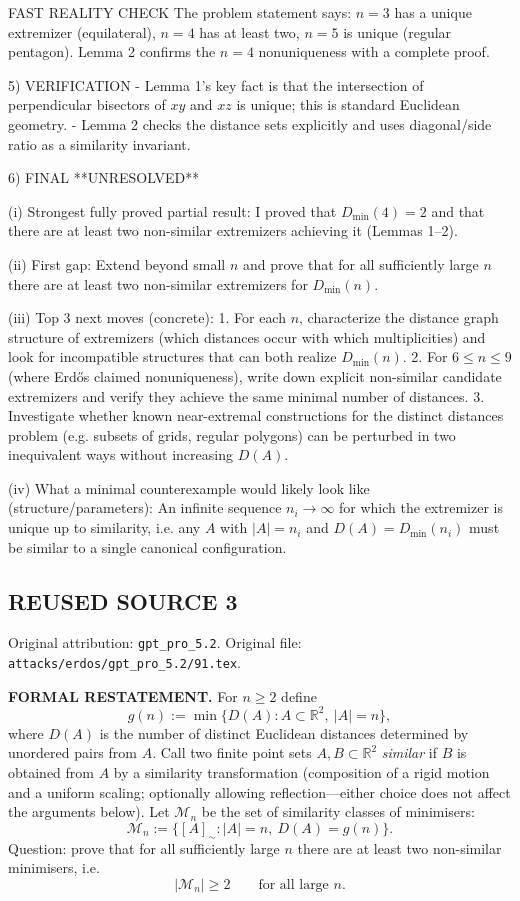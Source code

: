 FAST REALITY CHECK
The problem statement says: $n=3$ has a unique extremizer (equilateral), $n=4$ has at least two, $n=5$ is unique (regular pentagon).
Lemma 2 confirms the $n=4$ nonuniqueness with a complete proof.

5) VERIFICATION
- Lemma 1's key fact is that the intersection of perpendicular bisectors of $xy$ and $xz$ is unique; this is standard Euclidean geometry.
- Lemma 2 checks the distance sets explicitly and uses diagonal/side ratio as a similarity invariant.

6) FINAL
**UNRESOLVED**

(i) Strongest fully proved partial result:
I proved that $D_{\min}(4)=2$ and that there are at least two non-similar extremizers achieving it (Lemmas 1--2).

(ii) First gap:
Extend beyond small $n$ and prove that for all sufficiently large $n$ there are at least two non-similar extremizers for $D_{\min}(n)$.

(iii) Top 3 next moves (concrete):
1. For each $n$, characterize the distance graph structure of extremizers (which distances occur with which multiplicities) and look for incompatible structures that can both realize $D_{\min}(n)$.
2. For $6\le n\le 9$ (where Erd\H{o}s claimed nonuniqueness), write down explicit non-similar candidate extremizers and verify they achieve the same minimal number of distances.
3. Investigate whether known near-extremal constructions for the distinct distances problem (e.g. subsets of grids, regular polygons) can be perturbed in two inequivalent ways without increasing $D(A)$.

(iv) What a minimal counterexample would likely look like (structure/parameters):
An infinite sequence $n_i\to\infty$ for which the extremizer is unique up to similarity, i.e. any $A$ with $|A|=n_i$ and $D(A)=D_{\min}(n_i)$ must be similar to a single canonical configuration.



\subsection*{REUSED SOURCE 3}
Original attribution: \texttt{gpt\_pro\_5.2}.
Original file: \texttt{attacks/erdos/gpt\_pro\_5.2/91.tex}.


\noindent\textbf{FORMAL RESTATEMENT.}
For $n\ge 2$ define
\[
g(n):=\min\{D(A): A\subset\mathbb{R}^2,\ |A|=n\},
\]
where $D(A)$ is the number of distinct Euclidean distances determined by unordered pairs from $A$.
Call two finite point sets $A,B\subset\mathbb{R}^2$ \emph{similar} if $B$ is obtained from $A$ by a similarity transformation (composition of a rigid motion and a uniform scaling; optionally allowing reflection---either choice does not affect the arguments below).
Let $\mathcal{M}_n$ be the set of similarity classes of minimisers:
\[
\mathcal{M}_n:=\{[A]_{\sim}: |A|=n,\ D(A)=g(n)\}.
\]
Question: prove that for all sufficiently large $n$ there are at least two non-similar minimisers, i.e.
\[
|\mathcal{M}_n|\ge 2\qquad\text{for all large }n.
\]

